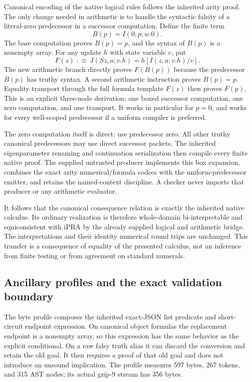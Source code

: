 Canonical encoding of the native logical rules follows the inherited
arity proof.  The only change needed in arithmetic is to handle the
syntactic falsity of a literal-zero predecessor in a successor
computation.
Define the finite term
\[
                         B(p)=I(0,p;w.0).
\]
The base computation proves $B(p)=p$, and the syntax of $B(p)$ is a
nonempty array.  For any update $h$ with state variable $v$, put
\[
 F(z)\;:\equiv\;
 I(Sz,a;v.h)=h[I(z,a;v.h)/v].
\]
The new arithmetic branch directly proves $F(B(p))$ because the
predecessor $B(p)$ has truthy syntax.  A second arithmetic instruction
proves $B(p)=p$.  Equality transport through the full formula template
$F(z)$ then proves $F(p)$.  This is an explicit three-node derivation:
one boxed successor computation, one zero computation, and one
transport.  It works in particular for $p=0$, and works for every
well-scoped predecessor if a uniform compiler is preferred.

The zero computation itself is direct: use predecessor zero.  All
other truthy canonical predecessors may use direct successor packets.
The inherited eigenparameter renaming and continuation serialization
then compile every finite native proof.  The supplied untrusted
producer implements this box expansion, combines the exact arity
numerical/formula codecs with the uniform-predecessor emitter, and
retains the named-context discipline.  A checker never imports that
producer or any arithmetic evaluator.

It follows that the canonical consequence relation is exactly the
inherited native calculus.  Its ordinary realization is therefore
whole-domain bi-interpretable and equiconsistent with iPRA by the
already supplied logical and arithmetic bridge.  The interpretations
and their identity numerical round trips are unchanged.  This transfer
is a consequence of equality of the presented calculus, not an inference
from finite testing or from agreement on standard numerals.

\subsection{Ancillary profiles and the exact validation boundary}

The byte profile composes the inherited exact-JSON list predicate and
short-circuit endpoint expression.  On canonical object formulas the
replacement endpoint is a nonempty array, so this expression has the
same behavior as the explicit conditional.  On a raw falsy truth alias
it can discard the conversion and retain the old goal.  It then requires
a proof of that old goal and does not introduce an unsound implication.
The profile measures 597 bytes, 267 tokens, and 315 AST nodes; its
actual gzip-9 stream has 356 bytes.

